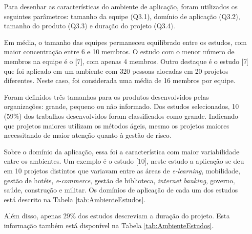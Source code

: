 \documentclass[
    12pt,       %
    openright,      %
    twoside,      %
    a4paper,      %
    english,      %
    french,       %
    spanish,      %
    brazil,       %
    ]{abntex2}
\begin{document}
Para desenhar as características do ambiente de aplicação, foram utilizados os seguintes parâmetros: tamanho da equipe (Q3.1), domínio de aplicação (Q3.2), tamanho do produto (Q3.3) e duração do projeto (Q3.4).

Em média, o tamanho das equipes permaneceu equilibrado entre os estudos, com maior concentração entre 6 e 10 membros. O estudo com o menor número de membros na equipe é o [7], com apenas 4 membros. Outro destaque é o estudo [7] que foi aplicado em um ambiente com 320 pessoas alocadas em 20 projetos diferentes. Neste caso, foi considerada uma média de 16 membros por equipe.

Foram definidos três tamanhos para os produtos desenvolvidos pelas organizações: grande, pequeno ou não informado. Dos estudos selecionados, 10 (59\%) dos trabalhos desenvolvidos foram classificados como grande. Indicando que projetos maiores utilizam os métodos ágeis, mesmo os projetos maiores necessitando de maior atenção quanto à gestão de risco.

Sobre o domínio da aplicação, essa foi a característica com maior variabilidade entre os ambientes. Um exemplo é o estudo [10], neste estudo a aplicação se deu em 10 projetos distintos que variavam entre as áreas de \textit{e-learning}, mobilidade, gestão de hotéis, \textit{e-commerce}, gestão de biblioteca, \textit{internet banking}, governo, saúde, construção e militar. Os domínios de aplicação de cada um dos estudos está descrito na Tabela \ref{tab:AmbienteEstudos}.

Além disso, apenas 29\% dos estudos descreviam a duração do projeto. Esta informação também está disponível na Tabela \ref{tab:AmbienteEstudos}.
\end{document}

